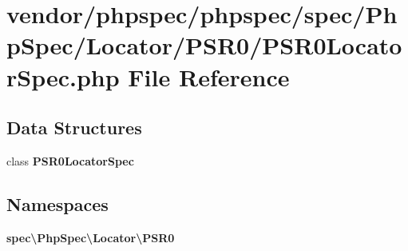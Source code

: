 \section{vendor/phpspec/phpspec/spec/\+Php\+Spec/\+Locator/\+P\+S\+R0/\+P\+S\+R0\+Locator\+Spec.php File Reference}
\label{_p_s_r0_locator_spec_8php}
\subsection*{Data Structures}
\begin{DoxyCompactItemize}
\item 
class {\bf P\+S\+R0\+Locator\+Spec}
\end{DoxyCompactItemize}
\subsection*{Namespaces}
\begin{DoxyCompactItemize}
\item 
 {\bf spec\textbackslash{}\+Php\+Spec\textbackslash{}\+Locator\textbackslash{}\+P\+S\+R0}
\end{DoxyCompactItemize}

